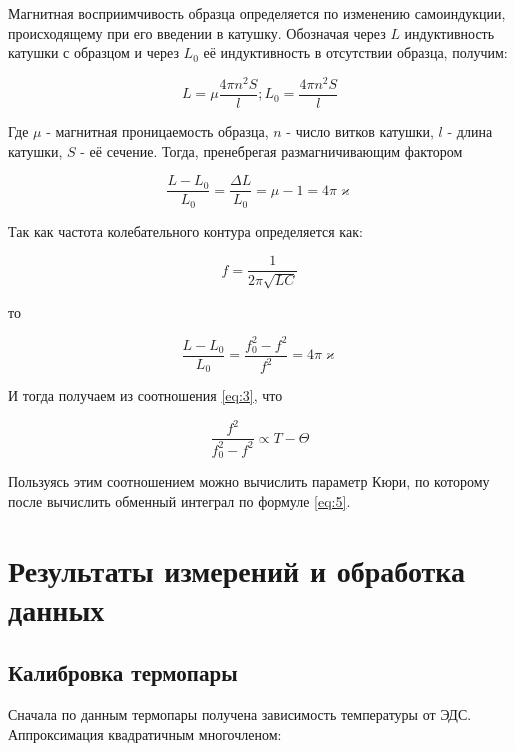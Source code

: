 \documentclass[a4paper,12pt]{article}
\begin{document}
Магнитная восприимчивость образца определяется по изменению самоиндукции, происходящему при его введении в катушку. Обозначая через $L$ индуктивность катушки с образцом и через $L_0$ её индуктивность в отсутствии образца, получим:

\begin{equation*}
    L=\mu \frac{4 \pi n^{2} S}{l} ; L_{0}=\frac{4 \pi n^{2} S}{l}
\end{equation*}

Где $\mu$ - магнитная проницаемость образца, $n$ - число витков катушки, $l$ - длина катушки, $S$ - её сечение. Тогда, пренебрегая размагничивающим фактором

\begin{equation*}
    \frac{L-L_{0}}{L_{0}} = \frac{\Delta L}{L_{0}} = \mu - 1 = 4 \pi \varkappa
\end{equation*}

Так как частота колебательного контура определяется как:

\begin{equation*}
    f = \frac{1}{2 \pi \sqrt{LC}}
\end{equation*}

то

\begin{equation*}
    \frac{L - L_0}{L_0} = \frac{f_0^2 - f^2}{f^2} = 4 \pi \varkappa
\end{equation*}

И тогда получаем из соотношения \eqref{eq:3}, что

\begin{equation}\label{eq:6}
    \frac{f^2}{f_0^2 - f^2} \propto T - \Theta
\end{equation}

Пользуясь этим соотношением можно вычислить параметр Кюри, по которому после вычислить обменный интеграл по формуле \eqref{eq:5}.

\clearpage

\section{Результаты измерений и обработка данных}

\subsection*{Калибровка термопары}

Сначала по данным термопары получена зависимость температуры от ЭДС. Аппроксимация квадратичным многочленом:
\end{document}
